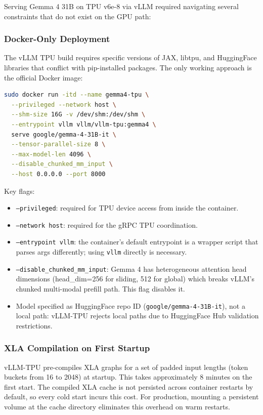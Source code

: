 \documentclass[11pt,a4paper]{article}
\begin{document}
Serving Gemma 4 31B on TPU v6e-8 via vLLM required navigating several constraints that do not exist on the GPU path:

\subsubsection{Docker-Only Deployment}

The vLLM TPU build requires specific versions of JAX, libtpu, and HuggingFace libraries that conflict with pip-installed packages. The only working approach is the official Docker image:

\begin{lstlisting}[language=bash]
sudo docker run -itd --name gemma4-tpu \
  --privileged --network host \
  --shm-size 16G -v /dev/shm:/dev/shm \
  --entrypoint vllm vllm/vllm-tpu:gemma4 \
  serve google/gemma-4-31B-it \
  --tensor-parallel-size 8 \
  --max-model-len 4096 \
  --disable_chunked_mm_input \
  --host 0.0.0.0 --port 8000
\end{lstlisting}

Key flags:
\begin{itemize}[nosep]
  \item \texttt{--privileged}: required for TPU device access from inside the container.
  \item \texttt{--network host}: required for the gRPC TPU coordination.
  \item \texttt{--entrypoint vllm}: the container's default entrypoint is a wrapper script that parses args differently; using \texttt{vllm} directly is necessary.
  \item \texttt{--disable\_chunked\_mm\_input}: Gemma 4 has heterogeneous attention head dimensions (head\_dim=256 for sliding, 512 for global) which breaks vLLM's chunked multi-modal prefill path. This flag disables it.
  \item Model specified as HuggingFace repo ID (\texttt{google/gemma-4-31B-it}), not a local path: vLLM-TPU rejects local paths due to HuggingFace Hub validation restrictions.
\end{itemize}

\subsubsection{XLA Compilation on First Startup}

vLLM-TPU pre-compiles XLA graphs for a set of padded input lengths (token buckets from 16 to 2048) at startup. This takes approximately 8 minutes on the first start. The compiled XLA cache is not persisted across container restarts by default, so every cold start incurs this cost. For production, mounting a persistent volume at the cache directory eliminates this overhead on warm restarts.
\end{document}
